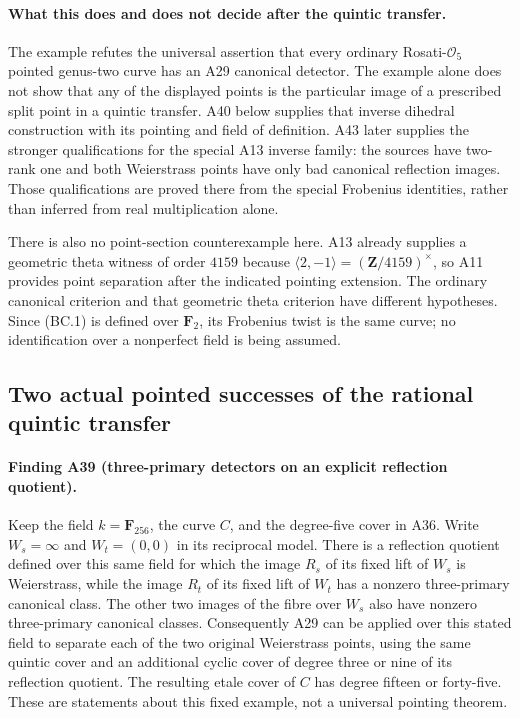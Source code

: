 \documentclass[11pt,a4paper]{article}
\begin{document}
\paragraph{What this does and does not decide after the quintic transfer.}
The example refutes the universal assertion that every ordinary
Rosati-$\mathcal O_5$ pointed genus-two curve has an A29
canonical detector. The example alone does not show that any of the
displayed points is the particular image of a prescribed split
point in a quintic transfer. A40 below supplies that inverse
dihedral construction with its pointing and field of definition.
A43 later supplies the stronger qualifications for the special
A13 inverse family: the sources have two-rank one and both
Weierstrass points have only bad canonical reflection images.
Those qualifications are proved there from the special Frobenius
identities, rather than inferred from real multiplication alone.

There is also no point-section counterexample here. A13 already
supplies a geometric theta witness of order $4159$ because
$\langle2,-1\rangle=(\mathbf Z/4159)^\times$, so A11
provides point separation after the indicated pointing extension.
The ordinary canonical criterion and that geometric theta
criterion have different hypotheses. Since (BC.1) is defined
over $\mathbf F_2$, its Frobenius twist is the same curve;
no identification over a nonperfect field is being assumed.


\subsection{Two actual pointed successes of the rational quintic transfer}
\label{sec:pointed-quintic-success}

\paragraph{Finding A39 (three-primary detectors on an explicit reflection quotient).}
Keep the field $k=\mathbf F_{256}$, the curve $C$, and the
degree-five cover in A36. Write $W_s=\infty$ and
$W_t=(0,0)$ in its reciprocal model. There is a reflection
quotient defined over this same field for which the image $R_s$
of its fixed lift of $W_s$ is Weierstrass, while the image $R_t$
of its fixed lift of $W_t$ has a nonzero three-primary canonical
class. The other two images of the fibre over $W_s$ also have
nonzero three-primary canonical classes. Consequently A29 can
be applied over this stated field to separate each of the two
original Weierstrass points, using the same quintic cover and
an additional cyclic cover of degree three or nine of its
reflection quotient. The resulting etale cover of $C$ has
degree fifteen or forty-five. These are statements about this
fixed example, not a universal pointing theorem.
\end{document}
